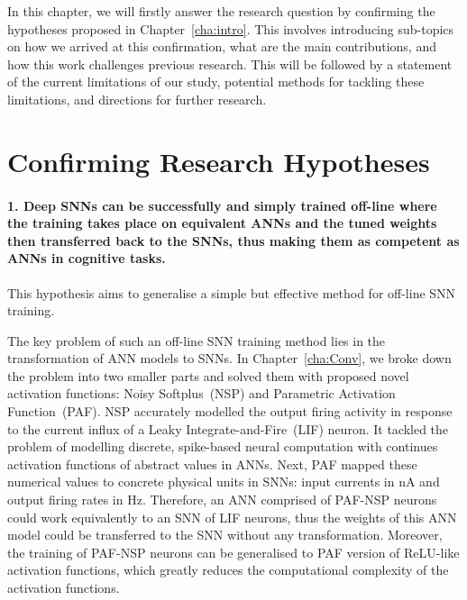 In this chapter, we will firstly answer the research question by confirming the hypotheses proposed in Chapter~\ref{cha:intro}.
This involves introducing sub-topics on how we arrived at this confirmation, what are the main contributions, and how this work challenges previous research.
This will be followed by a statement of the current limitations of our study, potential methods for tackling these limitations, and directions for further research.



\section{Confirming Research Hypotheses}
\paragraph{1. Deep SNNs can be successfully and simply trained off-line where the training takes place on equivalent ANNs and the tuned weights then transferred back to the SNNs, thus making them as competent as ANNs in cognitive tasks.}
This hypothesis aims to generalise a simple but effective method for off-line SNN training.

The key problem of such an off-line SNN training method lies in the transformation of ANN models to SNNs.
In Chapter~\ref{cha:Conv}, we broke down the problem into two smaller parts and solved them with proposed novel activation functions: Noisy Softplus~(NSP) and Parametric Activation Function~(PAF).
NSP accurately modelled the output firing activity in response to the current influx of a Leaky Integrate-and-Fire~(LIF) neuron.
It tackled the problem of modelling discrete, spike-based neural computation with continues activation functions of abstract values in ANNs.
Next, PAF mapped these numerical values to concrete physical units in SNNs: input currents in nA and output firing rates in Hz.
Therefore, an ANN comprised of PAF-NSP neurons could work equivalently to an SNN of LIF neurons, thus the weights of this ANN model could be transferred to the SNN without any transformation.
Moreover, the training of PAF-NSP neurons can be generalised to PAF version of ReLU-like activation functions, which greatly reduces the computational complexity of the activation functions.

